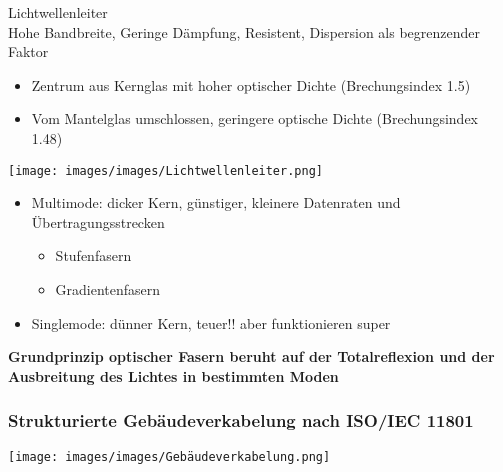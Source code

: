     \begin{concept}{Lichtwellenleiter}\\
        Hohe Bandbreite, Geringe Dämpfung, Resistent, Dispersion als begrenzender Faktor
        \begin{itemize}
            \item Zentrum aus Kernglas mit hoher optischer Dichte (Brechungsindex 1.5)
            \item Vom Mantelglas umschlossen, geringere optische Dichte (Brechungsindex 1.48)
        \end{itemize}
            \begin{center}
                \texttt{[image: images/images/Lichtwellenleiter.png]}\\
            \end{center}
        \begin{itemize}
            \item Multimode: dicker Kern, günstiger, kleinere Datenraten und Übertragungsstrecken
            \begin{itemize}
                \item Stufenfasern
                \item Gradientenfasern
            \end{itemize}
            \item Singlemode: dünner Kern, teuer!! aber funktionieren super
        \end{itemize}
        \vspace{2mm}
        \textbf{Grundprinzip optischer Fasern beruht auf der Totalreflexion und der Ausbreitung des Lichtes in bestimmten Moden}
    \end{concept}
  

    \subsubsection{Strukturierte Gebäudeverkabelung nach ISO/IEC 11801}
        \centering
        \texttt{[image: images/images/Gebäudeverkabelung.png]}
        
    